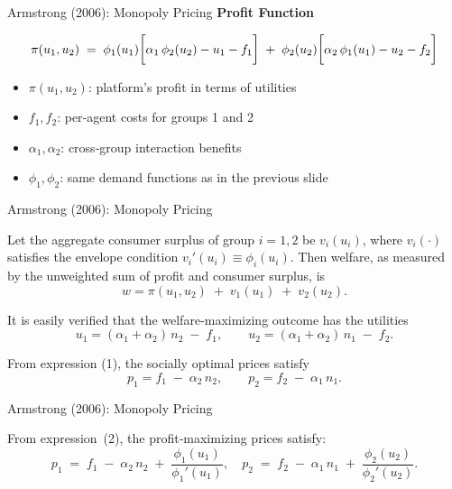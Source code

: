 \documentclass[aspectratio=169]{beamer}  %
\begin{document}
\begin{frame}{Armstrong (2006): Monopoly Pricing}
    \textbf{Profit Function}
    \vspace{1em}

    \begin{equation}
        \large
        \pi(u_{1}, u_{2}) \;=\; 
            \phi_{1}(u_{1})\Bigl[\alpha_{1}\,\phi_{2}(u_{2}) - u_{1} - f_{1}\Bigr]
            \;+\;
            \phi_{2}(u_{2})\Bigl[\alpha_{2}\,\phi_{1}(u_{1}) - u_{2} - f_{2}\Bigr]
    \end{equation}
    
    \begin{itemize}
      \item $\pi(u_{1},u_{2})$: platform’s profit in terms of utilities
      \item $f_{1},f_{2}$: per‐agent costs for groups 1 and 2
      \item $\alpha_{1}, \alpha_{2}$: cross‐group interaction benefits
      \item $\phi_{1}, \phi_{2}$: same demand functions as in the previous slide
    \end{itemize}
\end{frame}

\begin{frame}{Armstrong (2006): Monopoly Pricing}
    \justifying

    Let the aggregate consumer surplus of group \(i = 1, 2\) be \(v_i(u_i)\), 
    where \(v_i(\cdot)\) satisfies the envelope condition 
    \( v_i'(u_i) \equiv \phi_i(u_i) \). Then welfare, as measured by the unweighted 
    sum of profit and consumer surplus, is
    \[
       w = \pi(u_1, u_2) \;+\; v_1(u_1) \;+\; v_2(u_2).
    \]
    
    It is easily verified that the welfare‐maximizing outcome has the utilities
    \[
       u_1 = (\alpha_1 + \alpha_2)\,n_2 \;-\; f_1,
       \qquad
       u_2 = (\alpha_1 + \alpha_2)\,n_1 \;-\; f_2.
    \]
    
    From expression (1), the socially optimal prices satisfy
    \[
       p_1 = f_1 \;-\; \alpha_2\,n_2,
       \qquad
       p_2 = f_2 \;-\; \alpha_1\,n_1.
    \]
\end{frame}

\begin{frame}{Armstrong (2006): Monopoly Pricing}
    \justifying

    From expression~(2), the profit‐maximizing prices satisfy:
    \[
      p_{1} 
      \;=\; f_{1} \;-\; \alpha_{2}\,n_{2}
              \;+\; \frac{\phi_{1}(u_{1})}{\phi_{1}'(u_{1})},
      \quad
      p_{2} 
      \;=\; f_{2} \;-\; \alpha_{1}\,n_{1}
              \;+\; \frac{\phi_{2}(u_{2})}{\phi_{2}'(u_{2})}.
    \]
\end{frame}
\end{document}
